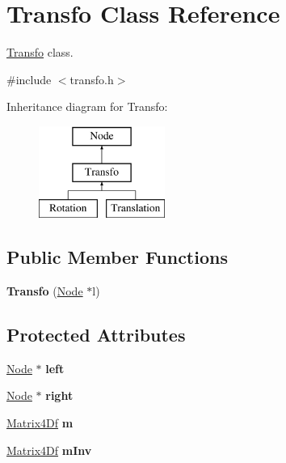 \hypertarget{class_transfo}{
\section{\-Transfo \-Class \-Reference}
\label{class_transfo}
}


\hyperlink{class_transfo}{\-Transfo} class.  




{\ttfamily \#include $<$transfo.\-h$>$}

\-Inheritance diagram for \-Transfo\-:\begin{figure}[H]
\begin{center}
\leavevmode
\includegraphics[height=3.000000cm]{class_transfo}
\end{center}
\end{figure}
\subsection*{\-Public \-Member \-Functions}
\begin{DoxyCompactItemize}
\item 
\hypertarget{class_transfo_a37b1c80234fdd7bb1e8f6191baf1a03c}{
{\bfseries \-Transfo} (\hyperlink{class_node}{\-Node} $\ast$l)}
\label{class_transfo_a37b1c80234fdd7bb1e8f6191baf1a03c}

\end{DoxyCompactItemize}
\subsection*{\-Protected \-Attributes}
\begin{DoxyCompactItemize}
\item 
\hypertarget{class_transfo_a09757e6952c70b4c5d533f76937cd01c}{
\hyperlink{class_node}{\-Node} $\ast$ {\bfseries left}}
\label{class_transfo_a09757e6952c70b4c5d533f76937cd01c}

\item 
\hypertarget{class_transfo_aadda74e44474e62e2d530dbc51ddfe84}{
\hyperlink{class_node}{\-Node} $\ast$ {\bfseries right}}
\label{class_transfo_aadda74e44474e62e2d530dbc51ddfe84}

\item 
\hypertarget{class_transfo_a4b903a28698fd3697f18e9df9e829372}{
\hyperlink{class_matrix4_df}{\-Matrix4\-Df} {\bfseries m}}
\label{class_transfo_a4b903a28698fd3697f18e9df9e829372}

\item 
\hypertarget{class_transfo_aab329728f1f9ba1f270c438990021eb8}{
\hyperlink{class_matrix4_df}{\-Matrix4\-Df} {\bfseries m\-Inv}}
\label{class_transfo_aab329728f1f9ba1f270c438990021eb8}

\end{DoxyCompactItemize}


